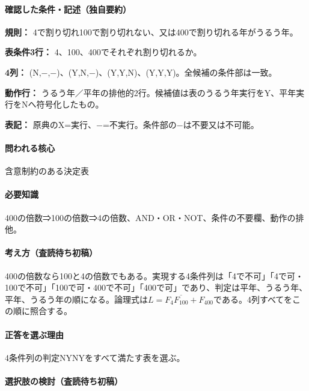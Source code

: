 \paragraph{確認した条件・記述（独自要約）}\mbox{}\par

\noindent\textbf{規則：} 4で割り切れ100で割り切れない、又は400で割り切れる年がうるう年。\par

\noindent\textbf{表条件3行：} 4、100、400でそれぞれ割り切れるか。\par

\noindent\textbf{4列：} (N,−,−)、(Y,N,−)、(Y,Y,N)、(Y,Y,Y)。全候補の条件部は一致。\par

\noindent\textbf{動作行：} うるう年／平年の排他的2行。候補値は表のうるう年実行をY、平年実行をNへ符号化したもの。\par

\noindent\textbf{表記：} 原典のX=実行、−=不実行。条件部の−は不要又は不可能。\par

\paragraph{問われる核心} 含意制約のある決定表

\paragraph{必要知識} 400の倍数⇒100の倍数⇒4の倍数、AND・OR・NOT、条件の不要欄、動作の排他。

\paragraph{考え方（査読待ち初稿）} 400の倍数なら100と4の倍数でもある。実現する4条件列は「4で不可」「4で可・100で不可」「100で可・400で不可」「400で可」であり、判定は平年、うるう年、平年、うるう年の順になる。論理式は\(L=F_4\overline{F_{100}}+F_{400}\)である。4列すべてをこの順に照合する。

\paragraph{正答を選ぶ理由} 4条件列の判定NYNYをすべて満たす表を選ぶ。

\paragraph{選択肢の検討（査読待ち初稿）}\mbox{}\par

